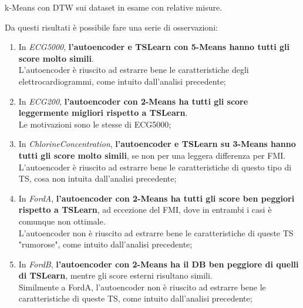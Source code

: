 \begin{center}
	\begin{table}[H]
		\centering
		\caption{k-Means con DTW sui dataset in esame con relative misure.}
	\end{table}
\end{center}

Da questi risultati è possibile fare una serie di osservazioni:
\begin{enumerate}
	\item In \textit{ECG5000}, \textbf{l'autoencoder e TSLearn con 5-Means hanno tutti gli score molto simili}.\\
	L'autoencoder è riuscito ad estrarre bene le caratteristiche degli elettrocardiogrammi, come intuito dall'analisi precedente;

	\item In \textit{ECG200}, \textbf{l'autoencoder con 2-Means ha tutti gli score leggermente migliori rispetto a TSLearn}.\\
	Le motivazioni sono le stesse di ECG5000;

	\item In \textit{ChlorineConcentration}, \textbf{l'autoencoder e TSLearn su 3-Means hanno tutti gli score molto simili}, se non per una leggera differenza per FMI.\\
	L'autoencoder è riuscito ad estrarre bene le caratteristiche di questo tipo di TS, cosa non intuita dall'analisi precedente;

	\item In \textit{FordA}, \textbf{l'autoencoder con 2-Means ha tutti gli score ben peggiori rispetto a TSLearn}, ad eccezione del FMI, dove in entrambi i casi è comunque non ottimale.\\ L'autoencoder non è riuscito ad estrarre bene le caratteristiche di queste TS "rumorose", come intuito dall'analisi precedente;

	\item In \textit{FordB}, \textbf{l'autoencoder con 2-Means ha il DB ben peggiore di quelli di TSLearn}, mentre gli score esterni risultano simili.\\
	Similmente a FordA, l'autoencoder non è riuscito ad estrarre bene le caratteristiche di queste TS, come intuito dall'analisi precedente;


\end{enumerate}
